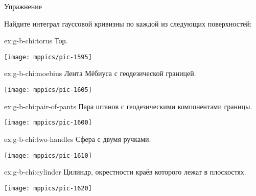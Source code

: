 \begin{thm}{Упражнение}\label{ex:g-b-chi}
{\sloppy
Найдите интеграл гауссовой кривизны по каждой из следующих поверхностей:

}

\setlength{\columnseprule}{0.4pt}
\begin{multicols}{2}

\begin{subthm}{ex:g-b-chi:torus}
Тор.
\end{subthm}

\begin{Figure}
\vskip-0mm
\centering
\texttt{[image: mppics/pic-1595]}
\end{Figure}

\begin{subthm}{ex:g-b-chi:moebius}
Лента Мёбиуса с геодезической границей.
\end{subthm}

\begin{Figure}
\vskip-0mm
\centering
\texttt{[image: mppics/pic-1605]}
\end{Figure}

\begin{subthm}{ex:g-b-chi:pair-of-pants}
Пара штанов с геодезическими компонентами границы.
\end{subthm}
\begin{Figure}
\vskip-0mm
\centering
\texttt{[image: mppics/pic-1600]}
\end{Figure}

\begin{subthm}{ex:g-b-chi:two-handles}
Сфера с двумя ручками.
\end{subthm}

\begin{Figure}
\vskip-0mm
\centering
\texttt{[image: mppics/pic-1610]}
\end{Figure}

\end{multicols}

\begin{subthm}{ex:g-b-chi:cylinder}
Цилиндр, окрестности краёв которого лежат в плоскостях.
\begin{Figure}
\vskip-0mm
\centering
\texttt{[image: mppics/pic-1620]}
\end{Figure}
\end{subthm}

\end{thm}
